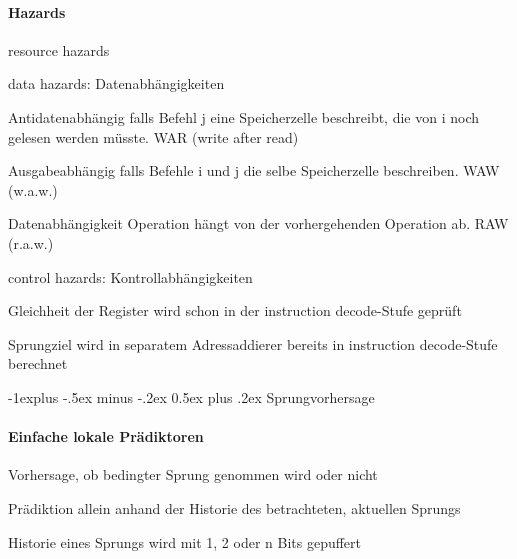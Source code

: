 \documentclass[10pt,landscape]{article}
\makeatletter
\renewcommand{\subsection}{\@startsection{subsection}{2}{0mm}%
                                {-1explus -.5ex minus -.2ex}%
                                {0.5ex plus .2ex}%
                                {\normalfont\normalsize\bfseries}}
\makeatother
\begin{document}
\begin{multicols}{3}
  \paragraph*{Hazards}
  \begin{itemize*}
    \item resource hazards
    \item data hazards: Datenabhängigkeiten
    \begin{description*}
      \item[Antidatenabhängig] falls Befehl j eine Speicherzelle beschreibt, die von i noch gelesen werden müsste. WAR (write after read)
      \item[Ausgabeabhängig] falls Befehle i und j die selbe Speicherzelle beschreiben. WAW (w.a.w.)
      \item[Datenabhängigkeit] Operation hängt von der vorhergehenden Operation ab. RAW (r.a.w.)
    \end{description*}
    \item control hazards: Kontrollabhängigkeiten
    \begin{itemize*}
      \item Gleichheit der Register wird schon in der instruction decode-Stufe geprüft
      \item Sprungziel wird in separatem Adressaddierer bereits in instruction decode-Stufe berechnet
    \end{itemize*}
  \end{itemize*}
  
  \subsection{ Sprungvorhersage}
  \paragraph{Einfache lokale Prädiktoren}
  \begin{itemize*}
    \item Vorhersage, ob bedingter Sprung genommen wird oder nicht
    \item Prädiktion allein anhand der Historie des betrachteten, aktuellen Sprungs
    \item Historie eines Sprungs wird mit 1, 2 oder n Bits gepuffert
  \end{itemize*}
  

\end{multicols}
\end{document}
